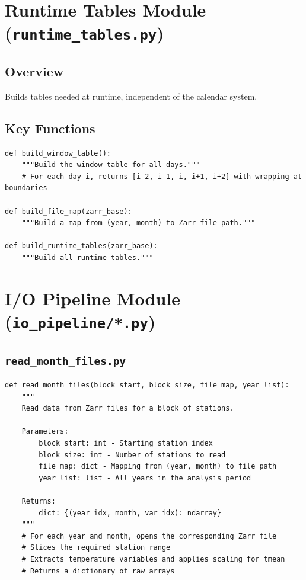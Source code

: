 ﻿\documentclass[12pt,a4paper]{report}
\begin{document}
\section{Runtime Tables Module (\texttt{runtime\_tables.py})}
\subsection{Overview}
Builds tables needed at runtime, independent of the calendar system.

\subsection{Key Functions}
\begin{lstlisting}[caption=Runtime Tables Functions]
def build_window_table():
    """Build the window table for all days."""
    # For each day i, returns [i-2, i-1, i, i+1, i+2] with wrapping at boundaries

def build_file_map(zarr_base):
    """Build a map from (year, month) to Zarr file path."""
    
def build_runtime_tables(zarr_base):
    """Build all runtime tables."""
\end{lstlisting}

\section{I/O Pipeline Module (\texttt{io\_pipeline/*.py})}
\subsection{\texttt{read\_month\_files.py}}
\begin{lstlisting}[caption=read\_month\_files.py]
def read_month_files(block_start, block_size, file_map, year_list):
    """
    Read data from Zarr files for a block of stations.
    
    Parameters:
        block_start: int - Starting station index
        block_size: int - Number of stations to read
        file_map: dict - Mapping from (year, month) to file path
        year_list: list - All years in the analysis period
    
    Returns:
        dict: {(year_idx, month, var_idx): ndarray}
    """
    # For each year and month, opens the corresponding Zarr file
    # Slices the required station range
    # Extracts temperature variables and applies scaling for tmean
    # Returns a dictionary of raw arrays
\end{lstlisting}
\end{document}
